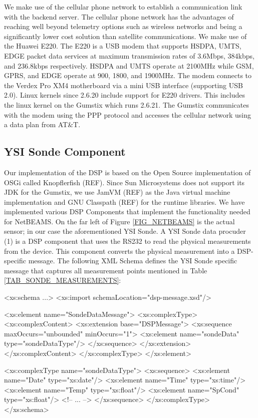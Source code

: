 \documentclass[conference]{IEEEtran}
\begin{document}
We make use of the cellular phone network to establish a communication
link with the backend server. The cellular phone network has the
advantages of reaching well beyond telemetry options such as wireless
networks and being a significantly lower cost solution than satellite
communications. We make use of the Huawei E220. The E220 is a USB
modem that supports HSDPA, UMTS, EDGE packet data services at maximum
transmission rates of 3.6Mbps, 384kbps, and 236.8kbps respectively.
HSDPA and UMTS operate at 2100MHz while GSM, GPRS, and EDGE operate at
900, 1800, and 1900MHz. The modem connects to the Verdex Pro XM4
motherboard via a mini USB interface (supporting USB 2.0). Linux
kernels since 2.6.20 include support for E220 drivers.  This includes
the linux kernel on the Gumstix which runs 2.6.21.  The Gumstix
communicates with the modem using the PPP protocol and accesses the
cellular network using a data plan from AT\&T.



\subsection{YSI Sonde Component}

Our implementation of the DSP is based on the Open Source
implementation of OSGi called Knopflerfish (REF). Since Sun
Microsystems does not support its JDK for the Gumstix, we use JamVM
(REF) as the Java virtual machine implementation and GNU Classpath
(REF) for the runtime libraries. We have implemented various DSP
Components that implement the functionality needed for NetBEAMS. On
the far left of Figure \ref{FIG_NETBEAMS} is the actual sensor; in our
case the aforementioned YSI Sonde. A YSI Sonde data procuder (1) is a DSP
component that uses the RS232 to read the physical measurements from
the device. This component converts the physical measurement into a
DSP-specific message. The following XML Schema defines the YSI Sonde
specific message that captures all measurement points mentioned in
Table \ref{TAB_SONDE_MEASUREMENTS}:

\begin{code}
<xs:schema ...>
<xs:import schemaLocation="dsp-message.xsd"/>

<xs:element name="SondeDataMessage">
  <xs:complexType>
    <xs:complexContent>
      <xs:extension base="DSPMessage">
        <xs:sequence maxOccurs="unbounded"
                     minOccurs="1">
          <xs:element name="sondeData"
                      type="sondeDataType"/>
        </xs:sequence>
      </xs:extension>
    </xs:complexContent>
  </xs:complexType>
</xs:element>

<xs:complexType name="sondeDataType">
  <xs:sequence>
    <xs:element name="Date" type="xs:date"/>
    <xs:element name="Time" type="xs:time"/>
    <xs:element name="Temp" type="xs:float"/>
    <xs:element name="SpCond" type="xs:float"/>
    <!-- ... -->
  </xs:sequence>
</xs:complexType>
</xs:schema>
\end{code}
\end{document}

